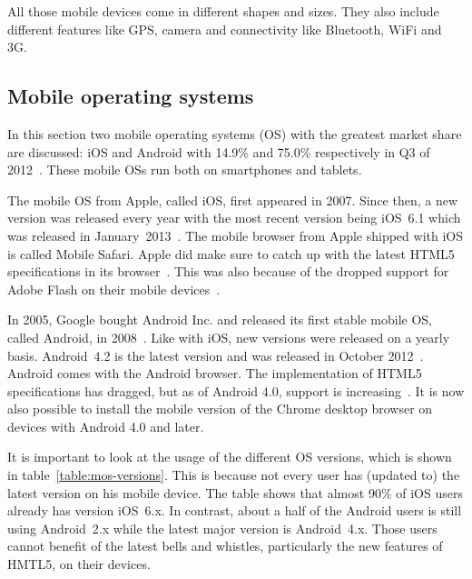 \documentclass[a4paper]{artikel3}
\begin{document}
All those mobile devices come in different shapes and sizes.
They also include different features like GPS, camera and connectivity like Bluetooth, WiFi and 3G.

\subsection{Mobile operating systems}
In this section two mobile operating systems (OS) with the greatest market share are discussed: iOS and Android with 14.9\% and 75.0\% respectively in Q3 of 2012~\cite{Protalinski2012}.
These mobile OSs run both on smartphones and tablets.

The mobile OS from Apple, called iOS, first appeared in 2007.
Since then, a new version was released every year with the most recent version being iOS~6.1 which was released in January~2013~\cite{Deitel2012,PhilDutson2012,Apple2013}.
The mobile browser from Apple shipped with iOS is called Mobile Safari.
Apple did make sure to catch up with the latest HTML5 specifications in its browser~\cite{Hales2012}.
This was also because of the dropped support for Adobe Flash on their mobile devices~\cite{Jobs2010}.

In 2005, Google bought Android Inc. and released its first stable mobile OS, called Android, in 2008~\cite{Satyesh2012}.
Like with iOS, new versions were released on a yearly basis.
Android~4.2 is the latest version and was released in October 2012~\cite{Sawers2012}.
Android comes with the Android browser.
The implementation of HTML5 specifications has dragged, but as of Android 4.0, support is increasing~\cite{Hales2012}.
It is now also possible to install the mobile version of the Chrome desktop browser on devices with Android 4.0 and later.

It is important to look at the usage of the different OS versions, which is shown in table~\ref{table:mos-versions}.
This is because not every user has (updated to) the latest version on his mobile device.
The table shows that almost 90\% of iOS users already has version iOS~6.x.
In contrast, about a half of the Android users is still using Android~2.x while the latest major version is Android~4.x. 
Those users cannot benefit of the latest bells and whistles, particularly the new features of HMTL5, on their devices.
\end{document}
